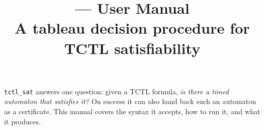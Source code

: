 \documentclass[11pt,a4paper]{article}
\title{\tool --- User Manual\\[2pt]
  \large A tableau decision procedure for TCTL satisfiability}
\author{}
\date{}
\newcommand{\tool}{\texttt{tctl\_sat}\xspace}
\begin{document}
\maketitle

\noindent
\tool answers one question: given a TCTL formula, \emph{is there a timed
automaton that satisfies it?}  On success it can also hand back such an
automaton as a certificate.  This manual covers the syntax it accepts, how to
run it, and what it produces.

\tableofcontents






\end{document}
